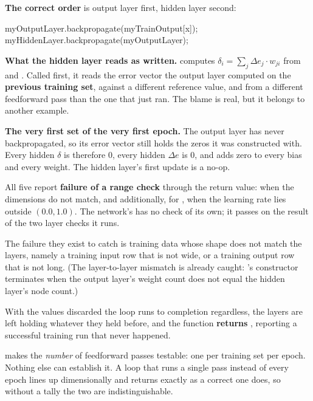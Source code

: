 \textbf{The correct order} is output layer first, hidden layer second:

\begin{cppcode}
myOutputLayer.backpropagate(myTrainOutput[x]);
myHiddenLayer.backpropagate(myOutputLayer);
\end{cppcode}

\textbf{What the hidden layer reads as written.} 
computes $\delta_i = \sum_j \Delta e_j \cdot w_{ji}$ from  and
. Called first, it reads the error vector the output layer computed on
the \textbf{previous training set}, against a different reference value, and from a different
feedforward pass than the one that just ran. The blame is real, but it belongs to another example.

\textbf{The very first set of the very first epoch.} The output layer has never backpropagated, so
its error vector still holds the zeros it was constructed with. Every hidden $\delta$ is therefore
$0$, every hidden $\Delta e$ is $0$, and  adds zero to every bias and
every weight. The hidden layer's first update is a no-op. 

All five report \textbf{failure of a range check} through the return value:  when the
dimensions do not match, and additionally, for , when the learning rate lies outside
$(0.0, 1.0)$. The network's  has no check of its own; it passes on the result of
the two layer checks it runs. 

The failure they exist to catch is training data whose shape does not match the layers, namely a
training input row that is not  wide, or a training output row that is not
 long. (The layer-to-layer mismatch is already caught: 's constructor
terminates when the output layer's weight count does not equal the hidden layer's node count.)

With the values discarded the loop runs to completion regardless, the layers are left holding
whatever they held before, and the function \textbf{returns }, reporting a successful
training run that never happened. 

\textbf{} makes the \emph{number} of feedforward passes testable: one per
training set per epoch. Nothing else can establish it. A loop that runs a single pass instead of
every epoch lines up dimensionally and returns  exactly as a correct one does, so without
a tally the two are indistinguishable.

